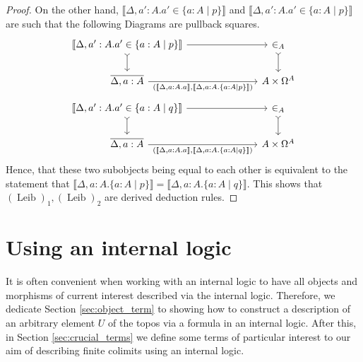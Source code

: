 \documentclass{tac}
\begin{document}
\begin{proof}
		On the other hand, $\llbracket \Delta, a':A. a' \in \lbrace a:A \mid p \rbrace \rrbracket$ and $\llbracket \Delta, a':A. a' \in \lbrace a:A \mid p \rbrace \rrbracket$ are such that the following Diagrams are pullback squares.
		\begin{equation}
			\begin{tikzcd}[column sep = large]
				\llbracket \Delta, a':A. a' \in \lbrace a:A \mid p \rbrace \rrbracket\arrow[d,rightarrowtail]\arrow[rr] && \in_A\arrow[d,rightarrowtail]\\
				\overline{\Delta, a:A}\arrow[rr,swap,"{(\llbracket \Delta, a:A.a\rrbracket, \llbracket \Delta,a:A. \lbrace a:A \mid p \rbrace\rrbracket)}"] && A \times \Omega^A
			\end{tikzcd}
			\end{equation}
		\begin{equation}
			\begin{tikzcd}[column sep = large]
				\llbracket \Delta, a':A. a' \in \lbrace a:A \mid q \rbrace \rrbracket\arrow[d,rightarrowtail]\arrow[rr] && \in_A\arrow[d,rightarrowtail]\\
				\overline{\Delta, a:A}\arrow[rr,swap,"{(\llbracket \Delta, a:A.a\rrbracket, \llbracket \Delta,a:A. \lbrace a:A \mid q \rbrace\rrbracket)}"] && A \times \Omega^A
			\end{tikzcd}
		\end{equation}
		Hence, that these two subobjects being equal to each other is equivalent to the statement that $\llbracket \Delta, a:A. \lbrace a :A \mid p \rbrace \rrbracket = \llbracket \Delta, a:A. \lbrace a:A \mid q \rbrace \rrbracket$. This shows that $(\operatorname{Leib})_1,(\operatorname{Leib})_2$ are derived deduction rules.
	\end{proof}
	
	\section{Using an internal logic}\label{sec:crucial_lemma}
	It is often convenient when working with an internal logic to have all objects and morphisms of current interest described via the internal logic. Therefore, we dedicate Section \ref{sec:object_term} to showing how to construct a description of an arbitrary element $U$ of the topos via a formula in an internal logic. After this, in Section \ref{sec:crucial_terms} we define some terms of particular interest to our aim of describing finite colimits using an internal logic.
\end{document}
